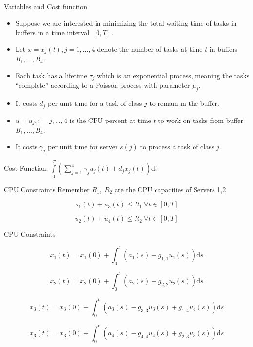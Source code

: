 \documentclass[pdf]{beamer}
\theoremstyle{definition}
\begin{document}
\begin{frame}{Variables and Cost function}
        \begin{itemize}
            \item Suppose we are interested in minimizing the total waiting time
            of tasks in buffers in a time interval $[0,T]$.
            \item Let $x = x_j(t), j=1,\ldots, 4$ denote the number of tasks at time $t$ in buffers $B_1, \ldots, B_4$.
            \item Each task has a lifetime $\tau_j$ which is an exponential process,
            meaning the tasks ``complete'' according to a Poisson process with parameter $\mu_j$.
            \item It costs $d_j$ per unit time for a task of class $j$ to remain in the buffer.
            \item $u = u_j, i=j,\ldots,4$ is the CPU percent at time $t$ to work on tasks from buffer $B_1, \ldots, B_4$.
            \item It costs $\gamma_j$ per unit time for server $s(j)$ to process a task of class $j$.
        \end{itemize}

        Cost Function:
        $
        \int\limits_0^T \left(\sum\limits_{j=1}^4 \gamma_j u_j(t) + d_j x_j(t) \right) \textrm{d}t
        $

\end{frame}


\begin{frame}{CPU Constraints}
        Remember $R_1,~R_2$ are the CPU capacities of Servers 1,2

        $$
        u_1(t) + u_3(t) \leq R_1 ~ \forall t \in [0,T]
        $$

        $$
        u_2(t) + u_4(t) \leq R_2 ~ \forall t \in [0,T]
        $$



\end{frame}


\begin{frame}{CPU Constraints}


$$
x_1(t) = x_1(0) + \int_0^t \left( a_1(s) - g_{1,1} u_1(s) \right) \textrm{d}s
$$

$$
x_2(t) = x_2(0) + \int_0^t \left( a_2(s) - g_{2,2} u_2(s) \right) \textrm{d}s
$$

$$
x_3(t) = x_3(0) + \int_0^t \left( a_3(s) - g_{3,3} u_3(s) + g_{1,4} u_4(s) \right) \textrm{d}s
$$

$$
x_3(t) = x_3(0) + \int_0^t \left( a_4(s) - g_{4,4} u_4(s)  + g_{2,3} u_3(s)\right) \textrm{d}s
$$

\end{frame}
\end{document}

